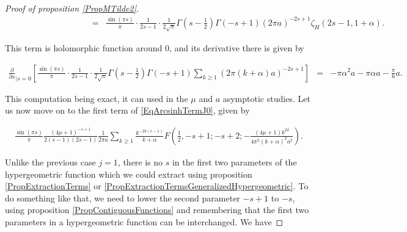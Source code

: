 \documentclass{jams-l}
\theoremstyle{definition}
\theoremstyle{remark}
\numberwithin{equation}{section}
\begin{document}
\begin{proof}[Proof of proposition \ref{PropMTilde2}]
\[\begin{array}{lll}
                                \qquad \qquad \qquad \qquad \quad & \scriptstyle = & \scriptstyle \frac{\sin \left( \pi s \right)}{\pi} \cdot \frac{1}{2s-1} \cdot \frac{1}{2 \sqrt{\pi}} \Gamma \left( s - \frac{1}{2} \right) \Gamma \left( -s+1 \right) \left( 2 \pi a \right)^{-2s+1} \zeta_H \left( 2s-1, 1+\alpha \right).
                            \end{array} \]
                        
                        \noindent This term is holomorphic function around $0$, and its derivative there is given by
                        
                        \[ \begin{array}{lll}
                                \scriptstyle \frac{\partial}{\partial s}_{\left \vert s = 0 \right.} \left[ \frac{\sin \left( \pi s \right)}{\pi} \cdot \frac{1}{2s-1} \cdot \frac{1}{2 \sqrt{\pi}} \Gamma \left( s - \frac{1}{2} \right) \Gamma \left( -s+1 \right) \sum\limits_{k \geqslant 1} \left( 2 \pi \left( k + \alpha \right) a \right)^{-2s+1} \right] & \scriptstyle = & \scriptstyle - \pi \alpha^2 a - \pi \alpha a - \frac{\pi}{6} a.
                            \end{array} \]
                        
                        \noindent This computation being exact, it can used in the $\mu$ and $a$ asymptotic studies. Let us now move on to the first term of \eqref{EqArcsinhTermJ0}, given by
                        
                        \begin{equation}
                        \label{EqArcsinhRemainingTermJ0}
                            \begin{array}{c}
                                \frac{\sin \left( \pi s \right)}{\pi} \frac{\left( 4 \mu + 1 \right)^{-s+1}}{2 \left( s-1 \right) \left( 2s-1 \right)} \frac{1}{2 \pi a} \sum\limits_{k \geqslant 1} \frac{k^{-2\delta \left( s - 1 \right)}}{k + \alpha} F \left( \frac{1}{2}, -s+1; -s+2;  - \frac{\left( 4  \mu + 1 \right) k^{2 \delta}}{4 \pi^2 \left( k + \alpha \right)^2 a^2} \right).
                            \end{array}
                        \end{equation}
                        
                        \noindent Unlike the previous case $j=1$, there is no $s$ in the first two parameters of the hypergeometric function which we could extract using proposition \ref{PropExtractionTerms} or \ref{PropExtractionTermsGeneralizedHypergeometric}. To do something like that, we need to lower the second parameter $-s+1$ to $-s$, using proposition \ref{PropContiguousFunctions} and remembering that the first two parameters in a hypergeometric function can be interchanged. We have
                        

\end{proof}
\end{document}
